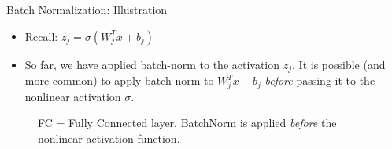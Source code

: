 \begin{frame} {Batch Normalization: Illustration}
  \begin{itemize}
    \item Recall: $z_j = \sigma(W_j^T x + b_j)$
    \item So far, we have applied batch-norm to the activation $z_j$. It is possible (and more common) to apply batch norm to $W_j^Tx + b_j$ \textit{before} passing it to the nonlinear activation $\sigma$.
  \end{itemize}
    \begin{figure}
    \centering
      \caption{\footnotesize FC = Fully Connected layer. BatchNorm is applied \textit{before} the nonlinear activation function.}
  \end{figure}
\end {frame}




